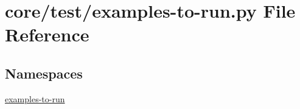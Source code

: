 \hypertarget{core_2test_2examples-to-run_8py}{}\section{core/test/examples-\/to-\/run.py File Reference}
\label{core_2test_2examples-to-run_8py}
\subsection*{Namespaces}
\begin{DoxyCompactItemize}
\item 
 \hyperlink{namespaceexamples-to-run}{examples-\/to-\/run}
\end{DoxyCompactItemize}
